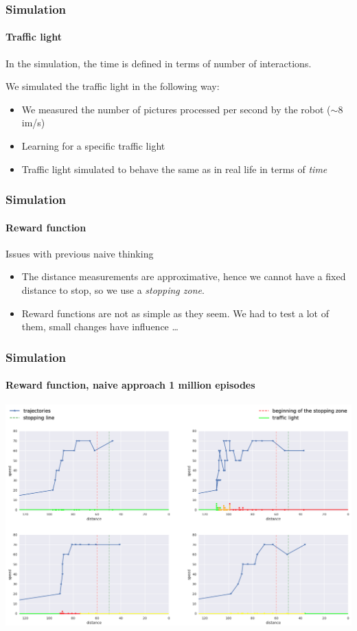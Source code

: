 \documentclass[dvipsnames,svgnames]{beamer}
\begin{document}
\begin{frame}
\frametitle{Simulation}
\framesubtitle{Traffic light}
In the simulation, the time is defined in terms of number of interactions.
\pause

We simulated the traffic light in the following way:
\begin{itemize}
\item We measured the number of pictures processed per second by the robot ($\sim 8 $ im/s)
\item \pause Learning for a specific traffic light 
\item \pause Traffic light simulated to behave the same as in real life in terms of \emph{time} 
\end{itemize}
\end{frame}



\begin{frame}
\frametitle{Simulation}
\framesubtitle{Reward function}

\begin{block}{Issues with previous naive thinking}
\begin{itemize}
\item The distance measurements are approximative, hence we cannot have a fixed distance to stop, so we use a \emph{stopping zone}.
\item Reward functions are not as simple as they seem. We had to test a lot of them, small changes have influence \ldots
\end{itemize}
\end{block}
\end{frame}

\begin{frame}
\frametitle{Simulation}
\framesubtitle{Reward function, naive approach 1 million episodes}

\centering
\includegraphics[scale=0.3]{img/new_legend_traj_weak.png}

\end{frame}
\end{document}
